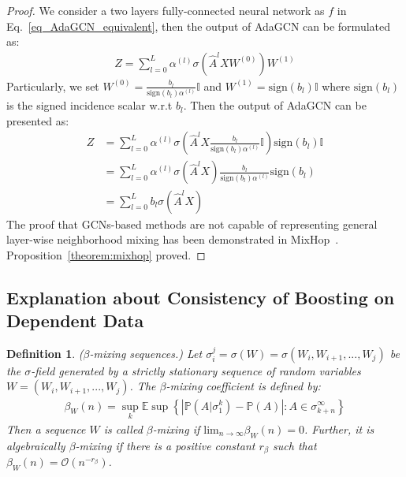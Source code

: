 \documentclass{article} \usepackage{iclr2021_conference,times}
\newtheorem{defn}{Definition}
\begin{document}
\begin{proof}
	We consider a two layers fully-connected neural network as $f$ in Eq.~\ref{eq_AdaGCN_equivalent}, then the output of AdaGCN can be formulated as:
	\begin{equation}  
	\begin{aligned} 
	Z=\sum_{l=0}^{L}\alpha^{(l)}\sigma(\hat{A}^l X W^{(0)}) W^{(1)} \nonumber
	\end{aligned} 
	\end{equation}
	Particularly, we set $W^{(0)}=\frac{b_l}{\text{sign}(b_l) \alpha^{(l)}} \mathbb{I}$ and $W^{(1)}=\text{sign}(b_l)\mathbb{I}$ where $\text{sign}(b_l)$ is the signed incidence scalar w.r.t $b_l$. Then the output of AdaGCN can be presented as:
	\begin{equation}  
	\begin{aligned} 
	Z&=\sum_{l=0}^{L}\alpha^{(l)}\sigma(\hat{A}^l X \frac{b_l}{\text{sign}(b_l) \alpha^{(l)}} \mathbb{I}) \text{sign}(b_l)\mathbb{I} \\ 
	&=\sum_{l=0}^{L}\alpha^{(l)}\sigma(\hat{A}^l X)\frac{b_l}{\text{sign}(b_l) \alpha^{(l)}} \text{sign}(b_l)\\
	&=\sum_{l=0}^{L} b_{l} \sigma\left(\hat{A}^{l} X\right) \nonumber 
	\end{aligned} 
	\end{equation}
	The proof that GCNs-based methods are not capable of representing general layer-wise neighborhood mixing has been demonstrated in MixHop~\citep{abu2019mixhop}. Proposition~\ref{theorem:mixhop} proved.
\end{proof}

\subsection{Explanation about Consistency of Boosting on Dependent Data} \label{sec: proof_boosting}

\begin{defn}
	($\beta$-mixing sequences.) Let $ \sigma_i^j= \sigma(W)=\sigma(W_i, W_{i+1}, ... , W_j)$ be the $\sigma$-field generated by a strictly stationary sequence of random variables $W = (W_i, W_{i+1}, ... , W_j)$. The $\beta$-mixing coefficient is defined by:
	\begin{equation}
	\begin{aligned}
	\beta_{W}(n)=\sup _{k} \mathbb{E} \sup \left\{\left|\mathbb{P}\left(A | \sigma_{1}^{k}\right)-\mathbb{P}(A)\right| : A \in \sigma_{k+n}^{\infty}\right\} \nonumber
	\end{aligned}
	\end{equation}
	Then a sequence $W$ is called $\beta$-mixing if $\text{lim}_{n\rightarrow \infty} \beta_W(n) = 0$. Further, it is algebraically $\beta$-mixing if there is a positive constant $r_{\beta}$ such that $\beta_{W}(n)=\mathcal{O}(n^{-r_{\beta}})$.
\end{defn}
\end{document}
